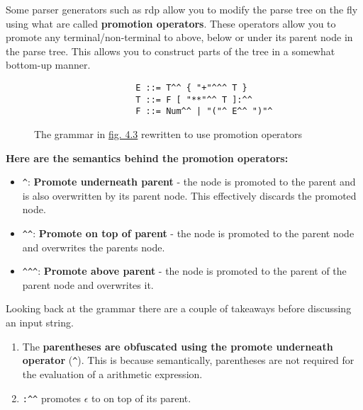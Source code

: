 \documentclass[12pt, letterpaper]{article}
\theoremstyle{definition}
\begin{document}
Some parser generators such as rdp allow you to modify the parse tree on the fly using what are called \textbf{promotion operators}\textsuperscript{\cite{johnstone_scott_1997}}. These operators allow you to promote any terminal/non-terminal to above, below or under its parent node in the parse tree. This allows you to construct parts of the tree in a somewhat bottom-up manner.

\begin{figure}[H]
    \begin{center}
        \begin{verbatim}
                    E ::= T^^ { "+"^^^ T }
                    T ::= F [ "**"^^ T ]:^^
                    F ::= Num^^ | "("^ E^^ ")"^
        \end{verbatim}
    \end{center}
    \vspace{-1.5em}
    \caption{\label{fig:4.4}The grammar in \hyperref[fig:4.3]{fig. 4.3} rewritten to use promotion operators}
\end{figure}

\begin{center}
    \textbf{Here are the semantics behind the promotion operators:}
    \begin{itemize}
        \item \verb|^|: \textbf{Promote underneath parent} - the node is promoted to the parent and is also overwritten by its parent node. This effectively discards the promoted node.
        \item \verb|^^|: \textbf{Promote on top of parent} - the node is promoted to the parent node and overwrites the parents node.
        \item \verb|^^^|: \textbf{Promote above parent} - the node is promoted to the parent of the parent node and overwrites it.
    \end{itemize}
\end{center}

Looking back at the grammar there are a couple of takeaways before discussing an input string.

\begin{enumerate}
    \item The \textbf{parentheses are obfuscated using the promote underneath operator} (\verb|^|). This is because semantically, parentheses are not required for the evaluation of a arithmetic expression.
    \item \verb|:^^| promotes $\epsilon$ to on top of its parent.
\end{enumerate}
\end{document}
